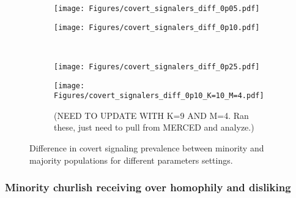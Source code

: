 \documentclass[11pt,letterpaper]{article}
\begin{document}
\begin{figure}[H]
  \centering
  \begin{subfigure}{0.48\textwidth}
    \centering
    \texttt{[image: Figures/covert\_signalers\_diff\_0p05.pdf]}
  \end{subfigure}
  \hfill
  \begin{subfigure}{0.48\textwidth}
    \centering
    \texttt{[image: Figures/covert\_signalers\_diff\_0p10.pdf]}
  \end{subfigure} \\[.25in]
  \begin{subfigure}{0.48\textwidth}
    \centering
    \texttt{[image: Figures/covert\_signalers\_diff\_0p25.pdf]}
  \end{subfigure}
  \hfill
  \begin{subfigure}{0.48\textwidth}
    \centering
    \texttt{[image: Figures/covert\_signalers\_diff\_0p10\_K=10\_M=4.pdf]}
    \caption{(NEED TO UPDATE WITH K=9 AND M=4. Ran these, just need to pull from
    MERCED and analyze.)}
  \end{subfigure}
  \caption{Difference in covert signaling prevalence between minority and
  majority populations for different parameters settings.}
  \label{fig:covert-signaling-minority-heatmap}
\end{figure}


\subsubsection{Minority churlish receiving over homophily and disliking}
\end{document}
